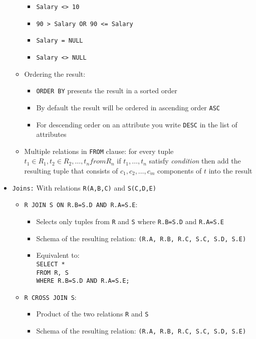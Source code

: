 \documentclass[landscape,8pt]{extarticle}
\newcommand{\code}{\lstinline}
\begin{document}
\begin{multicols}{4}
\begin{itemize}
\begin{itemize}
\begin{itemize}
            \item \code{Salary <> 10}
            \item \code{90 > Salary OR 90 <= Salary}
            \item \code{Salary = NULL}
            \item \code{Salary <> NULL}
            \end{itemize}
        \item Ordering the result:
        \begin{itemize}
            \item \code{ORDER BY} presents the result in a sorted order
            \item By default the result will be ordered in ascending order \code{ASC}
            \item For descending order on an attribute you write \code{DESC} in the list of attributes
        \end{itemize}
        \item Multiple relations in \code{FROM} clause: for every tuple $t_1 \in R_1, t_2 \in R_2,
        \ldots, t_n from R_n$ if $t_1, \ldots, t_n$ satisfy \emph{condition} then add the resulting
        tuple that consists of $c_1, c_2, \ldots, c_m$ components of $t$ into the result
    \end{itemize}
    \item \code{Joins:} With relations \code{R(A,B,C)} and \code{S(C,D,E)}
    \begin{itemize}
        \item \code{R JOIN S ON R.B=S.D AND R.A=S.E}:
        \begin{itemize}
            \item Selects only tuples from \code{R} and \code{S} where \code{R.B=S.D} and \code{R.A=S.E}
            \item Schema of the resulting relation: \code{(R.A, R.B, R.C, S.C, S.D, S.E)}
            \item Equivalent to: \\
            \code{SELECT *} \\
            \code{FROM R, S} \\
            \code{WHERE R.B=S.D AND R.A=S.E;}
        \end{itemize}
        \item \code{R CROSS JOIN S}:
        \begin{itemize}
            \item Product of the two relations \code{R} and \code{S}
            \item Schema of the resulting relation: \code{(R.A, R.B, R.C, S.C, S.D, S.E)}

\end{itemize}
\end{itemize}
\end{itemize}
\end{multicols}
\end{document}

